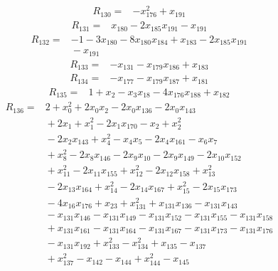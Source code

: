 {\begin{align*}
R_{130} ={}& -x_{176}^{2} + x_{191}
\end{align*}
\begin{align*}
R_{131} ={}& x_{180} - 2x_{185} x_{191} - x_{191}
\end{align*}
\begin{align*}
R_{132} ={}& -1 - 3x_{180} - 8x_{180} x_{184} + x_{183} - 2x_{185} x_{191} \\
&{}  - x_{191}
\end{align*}
\begin{align*}
R_{133} ={}& -x_{131} - x_{179} x_{186} + x_{183}
\end{align*}
\begin{align*}
R_{134} ={}& -x_{177} - x_{179} x_{187} + x_{181}
\end{align*}
\begin{align*}
R_{135} ={}& 1 + x_{2} - x_{3} x_{18} - 4x_{176} x_{188} + x_{182}
\end{align*}
\begin{align*}
R_{136} ={}& 2 + x_{0}^{2} + 2x_{0} x_{2} - 2x_{0} x_{136} - 2x_{0} x_{143} \\
&{}  + 2x_{1} + x_{1}^{2} - 2x_{1} x_{170} - x_{2} + x_{2}^{2} \\
&{}  - 2x_{2} x_{143} + x_{4}^{2} - x_{4} x_{5} - 2x_{4} x_{161} - x_{6} x_{7} \\
&{}  + x_{8}^{2} - 2x_{8} x_{146} - 2x_{9} x_{10} - 2x_{9} x_{149} - 2x_{10} x_{152} \\
&{}  + x_{11}^{2} - 2x_{11} x_{155} + x_{12}^{2} - 2x_{12} x_{158} + x_{13}^{2} \\
&{}  - 2x_{13} x_{164} + x_{14}^{2} - 2x_{14} x_{167} + x_{15}^{2} - 2x_{15} x_{173} \\
&{}  - 4x_{16} x_{176} + x_{23} + x_{131}^{2} + x_{131} x_{136} - x_{131} x_{143} \\
&{}  - x_{131} x_{146} - x_{131} x_{149} - x_{131} x_{152} - x_{131} x_{155} - x_{131} x_{158} \\
&{}  + x_{131} x_{161} - x_{131} x_{164} - x_{131} x_{167} - x_{131} x_{173} - x_{131} x_{176} \\
&{}  - x_{131} x_{192} + x_{133}^{2} - x_{134}^{2} + x_{135} - x_{137} \\
&{}  + x_{137}^{2} - x_{142} - x_{144} + x_{144}^{2} - x_{145} \\

\end{align*}}
